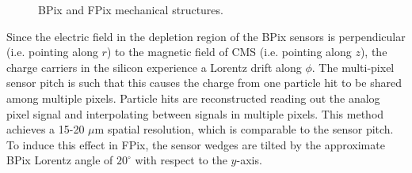 \documentclass[dissertation.tex]{subfiles}
\begin{document}
\begin{figure}
	\caption{BPix and FPix mechanical structures.}
	\label{fig:pixel_mechanics}
\end{figure}

Since the electric field in the depletion region of the BPix sensors is perpendicular (i.e. pointing along $r$) to the magnetic field of CMS (i.e. pointing along $z$), the charge carriers in the silicon experience a Lorentz drift along $\phi$.  The multi-pixel sensor pitch is such that this causes the charge from one particle hit to be shared among multiple pixels.  Particle hits are reconstructed reading out the analog pixel signal and interpolating between signals in multiple pixels.  This method achieves a 15-20 $\mu\mbox{m}$ spatial resolution, which is comparable to the sensor pitch.  To induce this effect in FPix, the sensor wedges are tilted by the approximate BPix Lorentz angle of $20^{\circ}$ \cite{Ivova} with respect to the $y$-axis.
\end{document}
